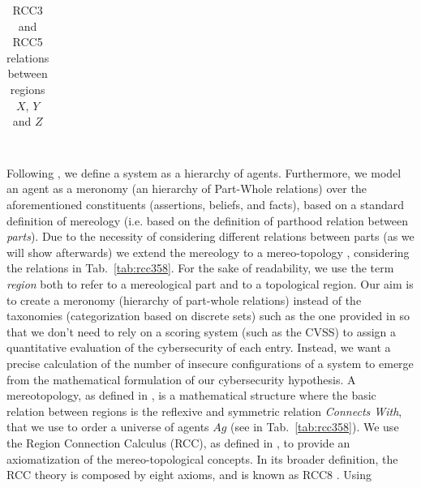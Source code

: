 \documentclass[runningheads]{llncs}
\newcommand{\Tdot}{$\CIRCLE$}
\newcommand{\agentuniverse}{Ag}
\begin{document}
\begin{table}[t]
\begin{tabular}{cclll}
\end{tabular}
\caption{RCC3 and RCC5 relations between regions $X$, $Y$ and $Z$ ~\label{tab:rcc358}~\label{tab:rcc}}
\end{table}

Following \autocite{Santaca2016abf}, we define a system as a hierarchy of agents. Furthermore, we model an agent as a meronomy (an
hierarchy of Part-Whole relations) over the aforementioned constituents 
(assertions, beliefs, and facts), based on a standard definition of mereology
(i.e. based on the definition of parthood relation between \emph{parts}).  Due to
the necessity of considering different relations between parts (as we will show afterwards)
we extend the mereology to a
mereo-topology \autocite{Smith1996mereotopology,Varzi1994mereotopology,Rachavelpula2017mereotopology},
considering the relations in Tab.~\ref{tab:rcc358}.  For the sake of
readability, we use the term \emph{region} both to refer to a mereological part
and to a topological region.  Our aim is to create a meronomy (hierarchy of
part-whole relations) instead of the taxonomies (categorization based on
discrete sets) such as the one provided in \autocite{NIST2020NVD,CVE}
so that we don't need to rely on a scoring system (such as the CVSS) to assign
a quantitative evaluation of the cybersecurity of each entry. Instead, we want
a precise calculation of the number of insecure configurations of a system to
emerge from the mathematical formulation of our cybersecurity hypothesis.
A mereotopology, as defined in \autocite{Rachavelpula2017mereotopology},
is a mathematical structure where the basic relation between regions
is the reflexive and symmetric relation \emph{Connects With},
that we use to order a universe of agents
$\agentuniverse$ (see in Tab.~\ref{tab:rcc358}).  We use the Region Connection
Calculus (RCC), as defined in \autocite{bennettLogics,improvingRCC}, to provide
an axiomatization of the mereo-topological concepts. In its broader definition,
the RCC theory is composed by eight axioms, and is known as RCC8 \autocite{Grutter2008rcc}. Using
\end{document}
